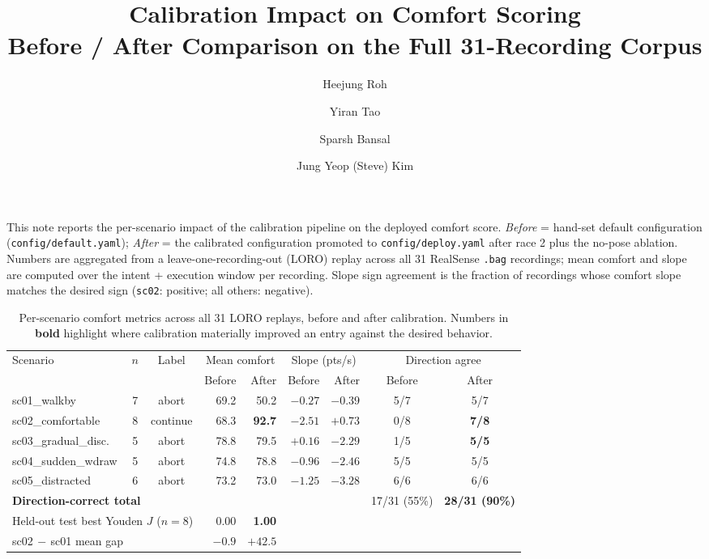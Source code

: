 \documentclass[11pt]{article}
\title{Calibration Impact on Comfort Scoring \\
  \large Before / After Comparison on the Full 31-Recording Corpus}
\author{Heejung Roh \and Yiran Tao \and Sparsh Bansal \and Jung Yeop (Steve) Kim}
\date{}
\begin{document}
\maketitle

\noindent
This note reports the per-scenario impact of the calibration pipeline on the
deployed comfort score. \textit{Before} = hand-set default configuration
(\texttt{config/default.yaml}); \textit{After} = the calibrated configuration
promoted to \texttt{config/deploy.yaml} after race 2 plus the no-pose
ablation. Numbers are aggregated from a leave-one-recording-out (LORO)
replay across all 31 RealSense \texttt{.bag} recordings; mean comfort and
slope are computed over the intent + execution window per recording. Slope
sign agreement is the fraction of recordings whose comfort slope matches the
desired sign (\texttt{sc02}: positive; all others: negative).

\begin{table}[h]
\centering
\caption{Per-scenario comfort metrics across all 31 LORO replays, before and
after calibration. Numbers in \textbf{bold} highlight where calibration
materially improved an entry against the desired behavior.}
\label{tab:calibration_comparison}
\small
\setlength{\tabcolsep}{5pt}
\renewcommand{\arraystretch}{1.15}
\begin{tabular}{l c c r r r r c c}
\toprule
\multirow{2}{*}{Scenario} & \multirow{2}{*}{$n$} & \multirow{2}{*}{Label}
  & \multicolumn{2}{c}{Mean comfort} & \multicolumn{2}{c}{Slope (pts/s)} & \multicolumn{2}{c}{Direction agree} \\
\cmidrule(lr){4-5}\cmidrule(lr){6-7}\cmidrule(lr){8-9}
 & & & Before & After & Before & After & Before & After \\
\midrule
sc01\_walkby            & 7 & abort    & 69.2 & 50.2 & $-0.27$ & $-0.39$ & 5/7 & 5/7 \\
sc02\_comfortable       & 8 & continue & 68.3 & {\bfseries\color{accent}92.7} & $-2.51$ & {\bfseries\color{accent}$+0.73$} & 0/8 & {\bfseries\color{accent}7/8} \\
sc03\_gradual\_disc.\   & 5 & abort    & 78.8 & 79.5 & $+0.16$ & {\bfseries\color{accent}$-2.29$} & 1/5 & {\bfseries\color{accent}5/5} \\
sc04\_sudden\_wdraw     & 5 & abort    & 74.8 & 78.8 & $-0.96$ & $-2.46$ & 5/5 & 5/5 \\
sc05\_distracted        & 6 & abort    & 73.2 & 73.0 & $-1.25$ & $-3.28$ & 6/6 & 6/6 \\
\midrule
\multicolumn{3}{l}{\textbf{Direction-correct total}} & & & & & 17/31 (55\%) & {\bfseries\color{accent}28/31 (90\%)} \\
\multicolumn{3}{l}{Held-out test best Youden $J$ \;($n{=}8$)} & 0.00 & {\bfseries\color{accent}1.00} & & & & \\
\multicolumn{3}{l}{sc02$\,-\,$sc01 mean gap} & $-0.9$ & {\bfseries\color{accent}$+42.5$} & & & & \\
\bottomrule
\end{tabular}
\end{table}
\end{document}
